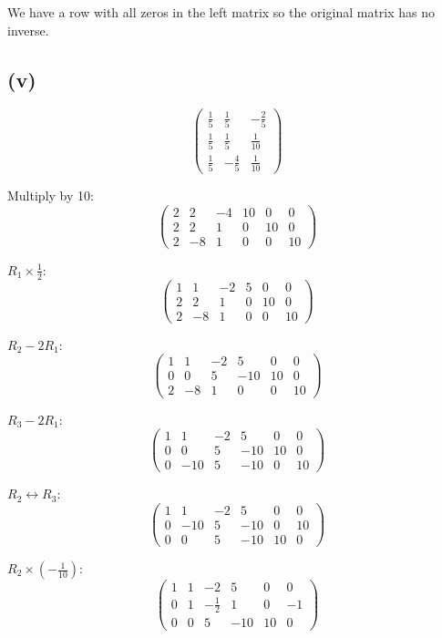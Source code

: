 \documentclass[12pt]{article}
\begin{document}
We have a row with all zeros in the left matrix so the original matrix has no inverse.

\subsection*{(v)}
\[
	\begin{pmatrix}
		\frac{1}{5} & \frac{1}{5}  & -\frac{2}{5} \\
		\frac{1}{5} & \frac{1}{5}  & \frac{1}{10} \\
		\frac{1}{5} & -\frac{4}{5} & \frac{1}{10}
	\end{pmatrix}
\]

Multiply by 10:
\[
	\begin{pmatrix}
		2 & 2  & -4 & 10 & 0  & 0  \\
		2 & 2  & 1  & 0  & 10 & 0  \\
		2 & -8 & 1  & 0  & 0  & 10
	\end{pmatrix}
\]

$R_1 \times \frac{1}{2}$:
\[
	\begin{pmatrix}
		1 & 1  & -2 & 5 & 0  & 0  \\
		2 & 2  & 1  & 0 & 10 & 0  \\
		2 & -8 & 1  & 0 & 0  & 10
	\end{pmatrix}
\]

$R_2 - 2R_1$:
\[
	\begin{pmatrix}
		1 & 1   & -2 & 5   & 0  & 0  \\
		0 & 0   & 5  & -10 & 10 & 0  \\
		2 & -8 & 1  & 0 & 0  & 10
	\end{pmatrix}
\]

$R_3 - 2R_1$:
\[
	\begin{pmatrix}
		1 & 1   & -2 & 5   & 0  & 0  \\
		0 & 0   & 5  & -10 & 10 & 0  \\
		0 & -10 & 5  & -10 & 0  & 10
	\end{pmatrix}
\]

$R_2 \leftrightarrow R_3$:
\[
	\begin{pmatrix}
		1 & 1   & -2 & 5   & 0  & 0  \\
		0 & -10 & 5  & -10 & 0  & 10 \\
		0 & 0   & 5  & -10 & 10 & 0
	\end{pmatrix}
\]

$R_2 \times (-\frac{1}{10})$:
\[
	\begin{pmatrix}
		1 & 1 & -2           & 5   & 0  & 0  \\
		0 & 1 & -\frac{1}{2} & 1   & 0  & -1 \\
		0 & 0 & 5            & -10 & 10 & 0
	\end{pmatrix}
\]
\end{document}
